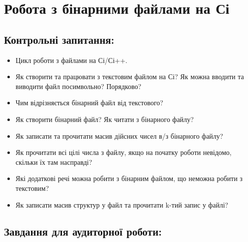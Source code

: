 \documentclass[a5paper,titlepage,openany,twoside,draft]{book_unv}%
\begin{document}
\chapter{Робота з бінарними файлами на Сі}
%

\section{Контрольні запитання:}
\begin{itemize}
\item
  Цикл роботи з файлами на Сі/Сі++.
\item
  Як створити та працювати з текстовим файлом на Сі? Як можна вводити та
  виводити файл посимвольно? Порядково?
\item
  Чим відрізняється бінарний файл від текстового? 
\item 
  Як створити бінарний файл? Як читати з бінарного файлу?
\item
  Як записати та прочитати масив дійсних чисел в/з бінарного файлу?
\item
  Як прочитати всі цілі числа з файлу, якщо на початку роботи невідомо,
  скільки їх там насправді?
\item
  Які додаткові речі можна робити з бінарним файлом, що неможна робити з
  текстовим?
\item
  Як записати масив структур у файл та прочитати k-тий запис у файлі?
\end{itemize}

\section{Завдання для аудиторної роботи:}
\end{document}
